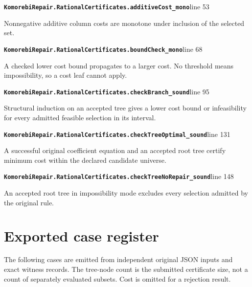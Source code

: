 \documentclass[11pt,letterpaper,oneside,openany]{book}
\theoremstyle{quiet}
\newcommand{\record}[3]{\noindent\begin{minipage}{\linewidth}\small\textbf{\nolinkurl{#1}}\hfill\textsf{line #2}\par\smallskip #3\end{minipage}\par\vspace{7pt}}
\begin{document}
\record{KomorebiRepair.RationalCertificates.additiveCost_mono}{53}{Nonnegative additive column costs are monotone under inclusion of the selected set.}

\record{KomorebiRepair.RationalCertificates.boundCheck_mono}{68}{A checked lower cost bound propagates to a larger cost. No threshold means impossibility, so a cost leaf cannot apply.}

\record{KomorebiRepair.RationalCertificates.checkBranch_sound}{95}{Structural induction on an accepted tree gives a lower cost bound or infeasibility for every admitted feasible selection in its interval.}

\record{KomorebiRepair.RationalCertificates.checkTreeOptimal_sound}{131}{A successful original coefficient equation and an accepted root tree certify minimum cost within the declared candidate universe.}

\record{KomorebiRepair.RationalCertificates.checkTreeNoRepair_sound}{148}{An accepted root tree in impossibility mode excludes every selection admitted by the original rule.}

\section{Exported case register}

The following cases are emitted from independent original JSON inputs and exact witness records. The tree-node count is the submitted certificate size, not a count of separately evaluated subsets. Cost is omitted for a rejection result.
\end{document}
